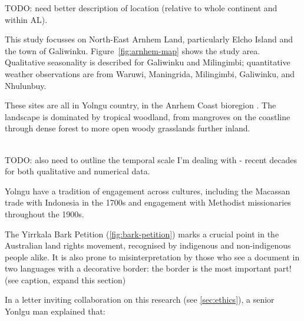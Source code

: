 TODO:  need better description of location (relative to whole continent and within AL).

This study focusses on North-East Arnhem Land, particularly Elcho Island
and the town of Galiwinku.  Figure~\ref{fig:arnhem-map} shows the study area.
Qualitative seasonality is described for Galiwinku and Milingimbi;
quantitative weather observations are from Waruwi, Maningrida, Milingimbi,
Galiwinku, and Nhulunbuy.

These sites are all in Yolngu country, in the Anrhem Coast bioregion \citep{ens2014}.
The landscape is dominated by tropical woodland, from mangroves on the coastline 
through dense forest to more open woody grasslands further inland.

~\\

TODO:  also need to outline the temporal scale I'm dealing with - recent
decades for both qualitative and numerical data.


Yolngu have a tradition of engagement across cultures, including
the Macassan trade with Indonesia in the 1700s and engagement with Methodist
missionaries throughout the 1900s.

The Yirrkala Bark Petition (\autoref{fig:bark-petition}) marks a crucial
point in the Australian land rights movement, recognised by indigenous and
non-indigenous people alike.  It is also prone to misinterpretation by those
who see a document in two languages with a decorative border: the border
is the most important part!  (see caption, expand this section)




In a letter inviting collaboration on this research (see \autoref{sec:ethics}),
a senior Yonlgu man explained that:

